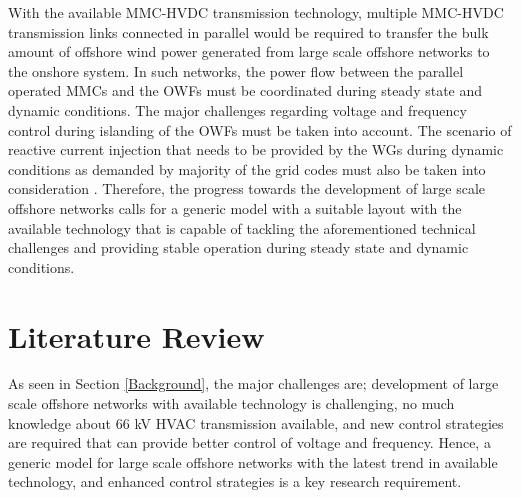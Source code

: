 With the available \gls{MMC}-\gls{HVDC} transmission technology, multiple \gls{MMC}-\gls{HVDC} transmission links connected in parallel would be required to transfer the bulk amount of offshore wind power generated from large scale offshore networks to the onshore system. In such networks, the power flow between the parallel operated \gls{MMC}s and the \gls{OWF}s must be coordinated during steady state and dynamic conditions. The major challenges regarding voltage and frequency control during islanding of the \gls{OWF}s must be taken into account. The scenario of reactive current injection that needs to be provided by the \gls{WG}s during dynamic conditions as demanded by majority of the grid codes must also be taken into consideration \cite{mohseni_review_2012}. Therefore, the progress towards the development of large scale offshore networks calls for a generic model with a suitable layout with the available technology that is capable of tackling the aforementioned technical challenges and providing stable operation during steady state and dynamic conditions. 


\section{Literature Review}\label{lit_review}

As seen in Section \ref{Background}, the major challenges are; development of large scale offshore networks with available technology is challenging, no much knowledge about 66 kV \gls{HVAC} transmission available, and new control strategies are required that can provide better control of voltage and frequency. Hence, a generic model for large scale offshore networks with the latest trend in available technology, and enhanced control strategies is a key research requirement. 

